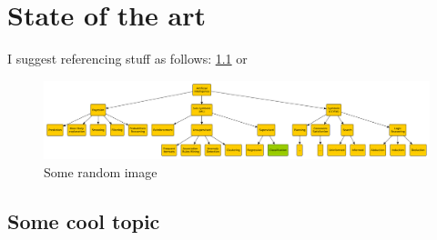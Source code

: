 \chapter{State of the art}
\label{chap:stateofart}

I suggest referencing stuff as follows: \cref{fig:random-image} or 

\begin{figure}
    \centering
    \includegraphics[width=.8\linewidth]{figures/random-image}
    \caption{Some random image}
    \label{fig:random-image}
\end{figure}

\section{Some cool topic}

